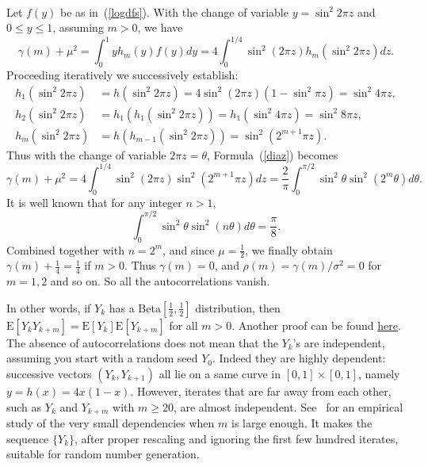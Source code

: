 \documentclass[oneside,10pt]{book}
\newenvironment{proof}[1][Proof]{\begin{trivlist}
\item[\hskip \labelsep {\bfseries #1}]}{\end{trivlist}}
\newcommand{\qed}{\nobreak \ifvmode \relax \else
      \ifdim\lastskip<1.5em \hskip-\lastskip
      \hskip1.5em plus0em minus0.5em \fi \nobreak
      \vrule height0.75em width0.5em depth0.25em\fi}
\begin{document}
\begin{proof}
\quad \\
Let $f(y)$ be as in~(\ref{logdfs}). With the change of variable $y=\sin^2 2\pi z$ and $0\leq y\leq 1$, assuming $m>0$, we have
\begin{equation}
\gamma(m)+\mu^2 = \int_0^1 y h_m(y) f(y) dy = 4 \int_0^{1/4} \sin^2 (2\pi z) h_m(\sin^2 2\pi z) dz.\label{diaz}
\end{equation}
Proceeding iteratively we successively establish:
\begin{align}
h_1(\sin^2 2\pi z) & = h(\sin^2 2\pi z) = 4 \sin^2 (2\pi z) (1- \sin^2 \pi z) = \sin^2 4\pi z, \nonumber \\
h_2(\sin^2 2\pi z) & = h_1(h_1(\sin^2 2\pi z)) = h_1(\sin^2 4\pi z)= \sin^2 8\pi z, \nonumber \\
h_m(\sin^2 2\pi z) & = h(h_{m-1}(\sin^2 2\pi z)) = \sin^2(2^{m+1}\pi z). \nonumber
\end{align}
Thus with the change of variable $2\pi z=\theta$, Formula~(\ref{diaz}) becomes
$$
\gamma(m)+\mu^2 = 4 \int_0^{1/4} \sin^2 (2\pi z)\sin^2 (2^{m+1}\pi z)dz = \frac{2}{\pi}\int_0^{\pi/2}\sin^2\theta \sin^2 (2^m\theta)d\theta.
$$
It is well known that for any integer $n>1$,
$$
\int_0^{\pi/2} \sin^2\theta \sin^2 (n \theta)d\theta =\frac{\pi}{8}.
$$
Combined together with $n=2^m$, and since $\mu=\frac{1}{2}$, we finally obtain
$\gamma(m)+\frac{1}{4} = \frac{1}{4}$ if $m>0$. Thus $\gamma(m)=0$, and $\rho(m)=\gamma(m)/\sigma^2=0$ for $m=1,2$ and so on. So all the autocorrelations vanish.
\qed
\end{proof}

In other words, if $Y_k$ has a $\text{Beta}[\frac{1}{2}, \frac{1}{2}]$ distribution, then $\text{E}[Y_k Y_{k+m}]=\text{E}[Y_k]\text{E}[Y_{k+m}]$ for all $m>0$. Another proof can be found \href{https://stats.stackexchange.com/questions/608109/autocorrelation-function-of-the-logistic-map-x-n1-4x-n1-x-n/}{here}.
The absence of autocorrelations does not mean that the $Y_k$'s are independent, assuming you start with a random seed $Y_0$.
 Indeed they are highly dependent: successive vectors $(Y_k,Y_{k+1})$ all lie on a same curve in $[0, 1]\times [0, 1]$, namely
 $y=h(x)= 4x(1-x)$. However, iterates that are far away from each other, such as $Y_k$ and $Y_{k+m}$
 with $m\geq 20$, are almost independent. See~\cite{cryptods2020} for an empirical study of the very small dependencies when $m$ is large
 enough. It makes the sequence $\{Y_k\}$, after proper rescaling and ignoring the first few hundred iterates, suitable for
\textcolor{index}{random number generation}.
\end{document}
